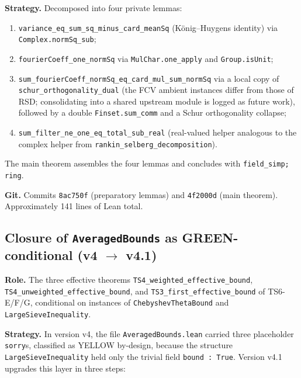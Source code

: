 \documentclass[11pt,a4paper]{article}
\theoremstyle{definition}
\begin{document}
\textbf{Strategy.} Decomposed into four private lemmas:
\begin{enumerate}[noitemsep]
\item \verb|variance_eq_sum_sq_minus_card_meanSq| (König--Huygens identity) via \verb|Complex.normSq_sub|;
\item \verb|fourierCoeff_one_normSq| via \verb|MulChar.one_apply| and \verb|Group.isUnit|;
\item \verb|sum_fourierCoeff_normSq_eq_card_mul_sum_normSq| via a local copy of \verb|schur_orthogonality_dual| (the FCV ambient instances differ from those of RSD; consolidating into a shared upstream module is logged as future work), followed by a double \verb|Finset.sum_comm| and a Schur orthogonality collapse;
\item \verb|sum_filter_ne_one_eq_total_sub_real| (real-valued helper analogous to the complex helper from \texttt{rankin\_selberg\_decomposition}).
\end{enumerate}
The main theorem assembles the four lemmas and concludes with \verb|field_simp; ring|.

\textbf{Git.} Commits \verb|8ac750f| (preparatory lemmas) and \verb|4f2000d| (main theorem). Approximately 141 lines of Lean total.

\subsection{Closure of \texttt{AveragedBounds} as GREEN-conditional (v4 \texorpdfstring{$\to$}{->} v4.1)}\label{sec:ab-closure}

\textbf{Role.} The three effective theorems \verb|TS4_weighted_effective_bound|, \verb|TS4_unweighted_effective_bound|, and \verb|TS3_first_effective_bound| of TS6-E/F/G, conditional on instances of \verb|ChebyshevThetaBound| and \verb|LargeSieveInequality|.

\textbf{Strategy.} In version v4, the file \verb|AveragedBounds.lean| carried three placeholder \texttt{sorry}s, classified as YELLOW by-design, because the structure \verb|LargeSieveInequality| held only the trivial field \verb|bound : True|. Version v4.1 upgrades this layer in three steps:
\end{document}
